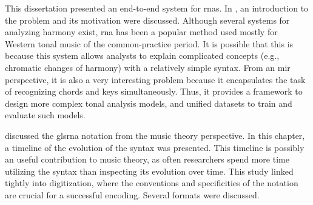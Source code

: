
This dissertation presented an end-to-end system for
\glspl{rna}. In , an introduction to
the problem and its motivation were discussed. Although
several systems for analyzing harmony exist, \gls{rna} has
been a popular method used mostly for Western tonal music of
the common-practice period. It is possible that this is
because this system allows analysts to explain complicated
concepts (e.g., chromatic changes of harmony) with a
relatively simple syntax. From an \gls{mir} perspective, it
is also a very interesting problem because it encapsulates
the task of recognizing chords and keys simultaneously.
Thus, it provides a framework to design more complex tonal
analysis models, and unified datasets to train and evaluate
such models.

 discussed the
gls{rna} notation from the music theory perspective. In this
chapter, a timeline of the evolution of the syntax was
presented. This timeline is possibly an useful contribution
to music theory, as often researchers spend more time
utilizing the syntax than inspecting its evolution over
time. This study linked tightly into digitization, where the
conventions and specificities of the notation are crucial
for a successful encoding. Several formats were discussed.
